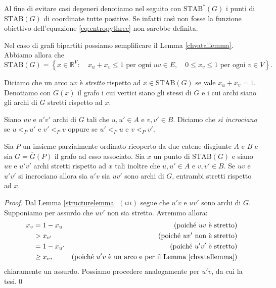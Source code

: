 Al fine di evitare casi degeneri denotiamo nel seguito con \(\text{STAB}^{*}(G)\) i punti di \(\text{STAB}(G)\) di coordinate tutte positive. Se infatti così non fosse la funzione obiettivo dell'equazione \eqref{eq:entropythree} non sarebbe definita.

Nel caso di grafi bipartiti possiamo semplificare il Lemma \ref{chvatallemma}. Abbiamo allora che
\[\text{STAB}(G)=\left\{x\in \mathbb{R}^V:\quad x_u + x_v\le 1 \text{ per ogni } uv\in E,\quad 0\le x_v\le 1 \text{ per ogni } v\in V\right\}.\]
\begin{definition}
	Diciamo che un arco \(uv\) è \emph{stretto} rispetto ad \(x\in\text{STAB}(G)\) se vale \(x_u+x_v=1\). Denotiamo con \(G(x)\) il grafo i cui vertici siano gli stessi di \(G\) e i cui archi siano gli archi di \(G\) stretti rispetto ad \(x\). 
\end{definition}
\begin{definition}
	Siano \(uv\) e \(u'v'\) archi di \(G\) tali che \(u,u'\in A\) e \(v,v'\in B\). Diciamo che \emph{si incrociano} se \(u<_{P}u'\) e \(v'<_{P}v\) oppure se \(u'<_{P}u\) e \(v<_{P}v'\). 
\end{definition}
\begin{lemma}
	\label{crossinglemma} Sia \(P\) un insieme parzialmente ordinato ricoperto da due catene disgiunte \(A\) e \(B\) e sia \(G=\overline{G}(P)\) il grafo ad esso associato. Sia \(x\) un punto di \(\text{STAB}(G)\) e siano \(uv\) e \(u'v'\) archi stretti rispetto ad \(x\) tali inoltre che \(u,u'\in A\) e \(v,v'\in B\). Se \(uv\) e \(u'v'\) si incrociano allora sia \(u'v\) sia \(uv'\) sono archi di \(G\), entrambi stretti rispetto ad \(x\). 
\end{lemma}
\begin{proof}
	Dal Lemma \ref{structurelemma} \((iii)\) segue che \(u'v\) e \(uv'\) sono archi di \(G\). Supponiamo per assurdo che \(uv'\) non sia stretto. Avremmo allora: 
	\begin{align}
		x_v &= 1-x_u &\text{(poich\'e } uv \text{ \`e stretto)}\nonumber \\
		&> x_{v'} &\text{(poich\'e } uv' \text{ non \`e stretto)}\nonumber \\
		&= 1-x_{u'} &\text{(poich\'e } u'v' \text{ \`e stretto)}\nonumber \\
		&\ge x_{v}, &\text{(poich\'e } u'v \text{ \`e un arco e per il Lemma \ref{chvatallemma})}\nonumber 
	\end{align}
	chiaramente un assurdo. Possiamo procedere analogamente per \(u'v\), da cui la tesi.\qed 
\end{proof}
